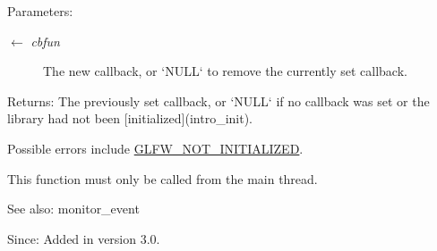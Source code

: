 \begin{Desc}
\item[Parameters:]
\begin{description}
\item[\mbox{$\leftarrow$} {\em cbfun}]The new callback, or `NULL` to remove the currently set callback. \end{description}
\end{Desc}
\begin{Desc}
\item[Returns:]The previously set callback, or `NULL` if no callback was set or the library had not been \mbox{[}initialized\mbox{]}(intro\_\-init).\end{Desc}
Possible errors include \hyperlink{group__errors_g2374ee02c177f12e1fa76ff3ed15e14a}{GLFW\_\-NOT\_\-INITIALIZED}.

This function must only be called from the main thread.

\begin{Desc}
\item[See also:]monitor\_\-event\end{Desc}
\begin{Desc}
\item[Since:]Added in version 3.0. \end{Desc}
